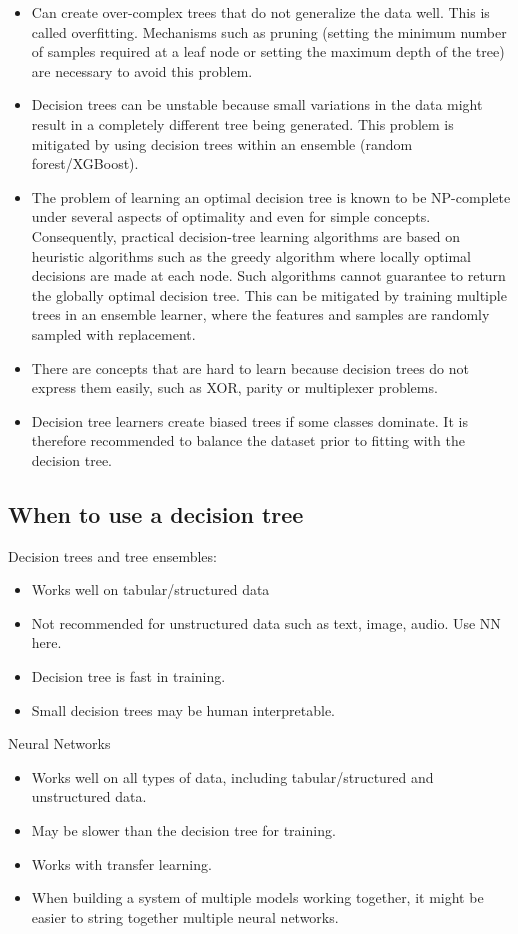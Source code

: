 \documentclass[12pt]{report}
\begin{document}
\begin{itemize}
\item Can create over-complex trees that do not generalize the data well. This is called overfitting. Mechanisms such as pruning (setting the minimum number of samples required at a leaf node or setting the maximum depth of the tree) are necessary to avoid this problem.
\item Decision trees can be unstable because small variations in the data might result in a completely different tree being generated. This problem is mitigated by using decision trees within an ensemble (random forest/XGBoost).
\item The problem of learning an optimal decision tree is known to be NP-complete under several aspects of optimality and even for simple concepts. Consequently, practical decision-tree learning algorithms are based on heuristic algorithms such as the greedy algorithm where locally optimal decisions are made at each node. Such algorithms cannot guarantee to return the globally optimal decision tree. This can be mitigated by training multiple trees in an ensemble learner, where the features and samples are randomly sampled with replacement.
\item There are concepts that are hard to learn because decision trees do not express them easily, such as XOR, parity or multiplexer problems.
\item Decision tree learners create biased trees if some classes dominate. It is therefore recommended to balance the dataset prior to fitting with the decision tree.
\end{itemize}

\subsection{When to use a decision tree}
Decision trees and tree ensembles:
\begin{itemize}
  \item Works well on tabular/structured data
  \item Not recommended for unstructured data such as text, image, audio. Use NN here.
  \item Decision tree is fast in training.
  \item Small decision trees may be human interpretable.
\end{itemize}
Neural Networks
\begin{itemize}
  \item Works well on all types of data, including tabular/structured and unstructured data.
  \item May be slower than the decision tree for training.
  \item Works with transfer learning.
  \item When building a system of multiple models working together, it might be easier to string together multiple neural networks.
\end{itemize}
\end{document}

